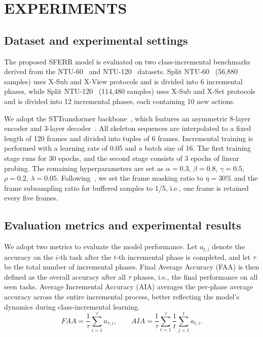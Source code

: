 \documentclass[journal]{IEEEtran}
\begin{document}
\section{EXPERIMENTS}

\subsection{Dataset and experimental settings}
The proposed SFERR model is evaluated on two class-incremental benchmarks derived from the NTU-60~\cite{Shahroudy2016ntu60} and NTU-120~\cite{Liu2019ntu120} datasets. 
Split NTU-60~\cite{boschini2023} (56,880 samples) uses X-Sub and X-View protocols and is divided into 6 incremental phases, while Split NTU-120~\cite{mosconi2024} (114,480 samples) uses X-Sub and X-Set protocols and is divided into 12 incremental phases, each containing 10 new actions.

We adopt the STTransformer backbone~\cite{qiu2022}, which features an asymmetric 8-layer encoder and 3-layer decoder~\cite{he2022}.
All skeleton sequences are interpolated to a fixed length of 120 frames and divided into tuples of 6 frames. 
Incremental training is performed with a learning rate of 0.05 and a batch size of 16.
The first training stage runs for 30 epochs, and the second stage consists of 3 epochs of linear probing.
The remaining hyperparameters are set as $\alpha=0.3$, $\beta=0.8$, $\gamma=0.5$, $\rho=0.2$, $\lambda = 0.05$.
Following~\cite{mosconi2024}, we set the frame masking ratio to $\eta=30\%$ and the frame subsampling ratio for buffered samples to 1/5, i.e., one frame is retained every five frames.


\subsection{Evaluation metrics and experimental results}
We adopt two metrics to evaluate the model performance.
Let $a_{t,i}$ denote the accuracy on the $i$-th task after the $t$-th incremental phase is completed, and let $\tau$ be the total number of incremental phases.
Final Average Accuracy (FAA) is then defined as the overall accuracy after all $\tau$ phases, i.e., the final performance on all seen tasks. 
Average Incremental Accuracy (AIA) averages the per-phase average accuracy across the entire incremental process, better reflecting the model's dynamics during class-incremental learning.
\begin{equation}
    FAA = \frac{1}{\tau} \sum_{i=1}^{\tau} a_{\tau,i},
    \qquad
    AIA = \frac{1}{\tau} \sum_{t=1}^{\tau} \frac{1}{t} \sum_{j=1}^{t} a_{t,i}.
\end{equation}
\end{document}
